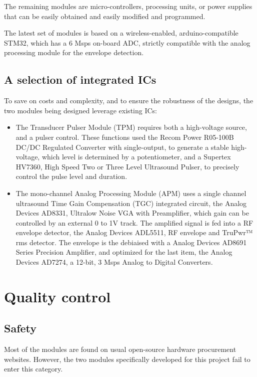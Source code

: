 \documentclass[letterpaper, 10 pt, conference]{ieeeconf} %
\begin{document}
The remaining modules are micro-controllers, processing units, or power supplies that can be easily obtained and easily modified and programmed.

The latest set of modules is based on a wireless-enabled, arduino-compatible STM32, which has a 6 Msps on-board ADC, strictly compatible with the analog processing module for the envelope detection.

\subsection{A selection of integrated ICs}

To save on costs and complexity, and to ensure the robustness of the designs, the two modules being designed leverage existing ICs:

\begin{itemize}
\item The Transducer Pulser Module (TPM) requires both a high-voltage source, and a pulser control. These functions used the Recom Power R05-100B DC/DC Regulated Converter with single-output, to generate a stable high-voltage, which level is determined by a potentiometer, and a Supertex HV7360, High Speed Two or Three Level Ultrasound Pulser, to precisely control the pulse level and duration.
\item The mono-channel Analog Processing Module (APM) uses a single channel ultrasound Time Gain Compensation (TGC) integrated circuit, the Analog Devices AD8331, Ultralow Noise VGA with Preamplifier, which gain can be controlled by an external 0 to 1V track. The amplified signal is fed into a RF envelope detector, the Analog Devices ADL5511, RF envelope and TruPwr™ rms detector. The envelope is the debiaised with a Analog Devices AD8691 Series Precision Amplifier, and optimized for the last item, the  Analog Devices AD7274, a 12-bit, 3 Msps Analog to Digital Converters.
\end{itemize}

\section{Quality control}

\subsection{Safety}
Most of the modules are found on usual open-source hardware procurement websites. However, the two modules specifically developed for this project fail to enter this category.
\end{document}
